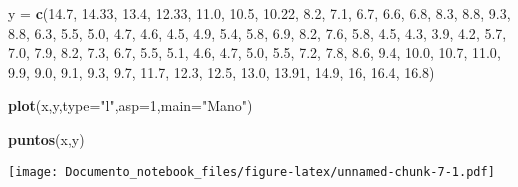 \documentclass[]{article}
\newenvironment{Shaded}{\begin{snugshade}}{\end{snugshade}}
\newcommand{\KeywordTok}[1]{\textcolor[rgb]{0.13,0.29,0.53}{\textbf{#1}}}
\newcommand{\DataTypeTok}[1]{\textcolor[rgb]{0.13,0.29,0.53}{#1}}
\newcommand{\DecValTok}[1]{\textcolor[rgb]{0.00,0.00,0.81}{#1}}
\newcommand{\FloatTok}[1]{\textcolor[rgb]{0.00,0.00,0.81}{#1}}
\newcommand{\StringTok}[1]{\textcolor[rgb]{0.31,0.60,0.02}{#1}}
\newcommand{\NormalTok}[1]{#1}
\begin{document}
\begin{Shaded}
\begin{Highlighting}[]
\NormalTok{y =}\StringTok{ }\KeywordTok{c}\NormalTok{(}\FloatTok{14.7}\NormalTok{, }\FloatTok{14.33}\NormalTok{, }\FloatTok{13.4}\NormalTok{, }\FloatTok{12.33}\NormalTok{, }\FloatTok{11.0}\NormalTok{, }\FloatTok{10.5}\NormalTok{, }\FloatTok{10.22}\NormalTok{, }\FloatTok{8.2}\NormalTok{, }\FloatTok{7.1}\NormalTok{, }\FloatTok{6.7}\NormalTok{, }\FloatTok{6.6}\NormalTok{, }
      \FloatTok{6.8}\NormalTok{, }\FloatTok{8.3}\NormalTok{, }\FloatTok{8.8}\NormalTok{, }\FloatTok{9.3}\NormalTok{, }\FloatTok{8.8}\NormalTok{, }
      \FloatTok{6.3}\NormalTok{, }\FloatTok{5.5}\NormalTok{, }\FloatTok{5.0}\NormalTok{, }\FloatTok{4.7}\NormalTok{, }\FloatTok{4.6}\NormalTok{, }\FloatTok{4.5}\NormalTok{, }\FloatTok{4.9}\NormalTok{, }\FloatTok{5.4}\NormalTok{, }\FloatTok{5.8}\NormalTok{, }\FloatTok{6.9}\NormalTok{, }\FloatTok{8.2}\NormalTok{, }\FloatTok{7.6}\NormalTok{, }
      \FloatTok{5.8}\NormalTok{, }\FloatTok{4.5}\NormalTok{, }\FloatTok{4.3}\NormalTok{, }\FloatTok{3.9}\NormalTok{, }\FloatTok{4.2}\NormalTok{, }\FloatTok{5.7}\NormalTok{, }\FloatTok{7.0}\NormalTok{, }\FloatTok{7.9}\NormalTok{, }\FloatTok{8.2}\NormalTok{, }\FloatTok{7.3}\NormalTok{, }
      \FloatTok{6.7}\NormalTok{, }\FloatTok{5.5}\NormalTok{, }\FloatTok{5.1}\NormalTok{, }\FloatTok{4.6}\NormalTok{, }\FloatTok{4.7}\NormalTok{, }\FloatTok{5.0}\NormalTok{, }\FloatTok{5.5}\NormalTok{, }\FloatTok{7.2}\NormalTok{, }\FloatTok{7.8}\NormalTok{, }\FloatTok{8.6}\NormalTok{, }\FloatTok{9.4}\NormalTok{, }\FloatTok{10.0}\NormalTok{,  }\FloatTok{10.7}\NormalTok{, }\FloatTok{11.0}\NormalTok{, }
      \FloatTok{9.9}\NormalTok{, }\FloatTok{9.0}\NormalTok{, }\FloatTok{9.1}\NormalTok{, }\FloatTok{9.3}\NormalTok{, }\FloatTok{9.7}\NormalTok{, }\FloatTok{11.7}\NormalTok{, }
      \FloatTok{12.3}\NormalTok{, }\FloatTok{12.5}\NormalTok{, }\FloatTok{13.0}\NormalTok{, }\FloatTok{13.91}\NormalTok{, }\FloatTok{14.9}\NormalTok{, }\DecValTok{16}\NormalTok{, }\FloatTok{16.4}\NormalTok{, }\FloatTok{16.8}\NormalTok{)}


\KeywordTok{plot}\NormalTok{(x,y,}\DataTypeTok{type=}\StringTok{"l"}\NormalTok{,}\DataTypeTok{asp=}\DecValTok{1}\NormalTok{,}\DataTypeTok{main=}\StringTok{"Mano"}\NormalTok{)}

\KeywordTok{puntos}\NormalTok{(x,y)}
\end{Highlighting}
\end{Shaded}

\texttt{[image: Documento\_notebook\_files/figure-latex/unnamed-chunk-7-1.pdf]}
\end{document}
